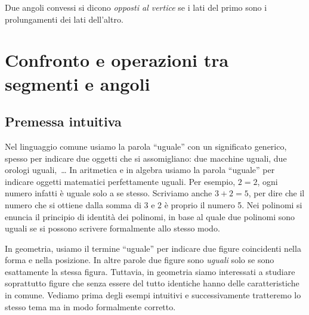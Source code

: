 \begin{definizione}
Due angoli convessi si dicono \emph{opposti al vertice} se i lati del 
primo sono i prolungamenti dei lati dell'altro.
\end{definizione}

\begin{inaccessibleblock}
 \begin{center} 
  
 \end{center}
\end{inaccessibleblock}

% 


\section{Confronto e operazioni tra segmenti e 
angoli}\label{sect:operazioni_segmenti_angoli}

\subsection{Premessa intuitiva}

Nel linguaggio comune usiamo la parola ``uguale'' con un significato 
generico, spesso per indicare due oggetti che si assomigliano: due 
macchine uguali, due orologi uguali,~\ldots{} In aritmetica e in 
algebra usiamo la parola ``uguale'' per indicare oggetti matematici 
perfettamente uguali. Per esempio, \(2=2\), ogni numero infatti è 
uguale solo a se stesso. Scriviamo anche \(3+2=5\), per dire che il 
numero che si ottiene dalla somma di 3 e 2 è proprio il numero 5. Nei 
polinomi si enuncia il principio di identità dei polinomi, in base al 
quale due polinomi sono uguali se si possono scrivere formalmente 
allo stesso modo.

In geometria, usiamo il termine ``uguale'' per indicare due figure 
coincidenti nella forma e nella posizione. In altre parole due figure 
sono \emph{uguali} solo se sono esattamente la stessa figura. 
Tuttavia, in geometria siamo interessati a studiare soprattutto 
figure che senza essere del tutto identiche hanno delle 
caratteristiche in comune. Vediamo prima degli esempi intuitivi e 
successivamente tratteremo lo stesso tema ma in modo formalmente 
corretto.
\vspace{5mm}

